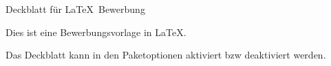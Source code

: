 
\clearpage
\pagestyle{empty}%

\Huge
Deckblatt für \LaTeX\ Bewerbung

\normalsize 	
Dies ist eine Bewerbungsvorlage in \LaTeX.

Das Deckblatt kann in den Paketoptionen aktiviert bzw deaktiviert werden.

